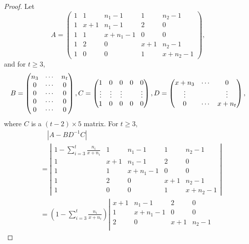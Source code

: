 \documentclass[12pt]{article}
\numberwithin{equation}{section}
\begin{document}
\begin{proof} Let \[
 A=\begin{pmatrix}
1 & 1 & n_1-1 & 1 & n_2-1 \\
1 & x+1 & n_1-1 & 2 & 0\\
1 & 1 & x+n_1-1 & 0 & 0 \\
1 & 2 & 0 & x+1 & n_2-1 \\
1 & 0 & 0 & 1 & x+n_2-1
\end{pmatrix}, 
\]
and for $t\ge 3$, 
\[
B=\begin{pmatrix}
 n_3 & \cdots & n_t\\
 0 & \cdots & 0\\
 0 & \cdots & 0\\
 0 & \cdots & 0\\
 0 & \cdots & 0\\
\end{pmatrix},\\
 C=\begin{pmatrix}
1 & 0 & 0 & 0 & 0 \\
\vdots & \vdots & \vdots & & \vdots\\
1 & 0 & 0 & 0 & 0 
\end{pmatrix}, 
D=\begin{pmatrix}
x+n_3 & \cdots & 0\\
 \vdots & & \vdots\\
0 & \cdots & x+n_t
\end{pmatrix},
\]
where $C$ is a $(t-2)\times 5$ matrix. For $t\ge 3$,
\begin{align*}
&\quad |A-BD^{-1}C|\\
&=\left| \begin{array}{ccccc}
1-\sum_{i=3}^{t}\frac{n_i}{x+n_i} & 1 & n_1-1 & 1 & n_2-1\\
1 & x+1 & n_1-1 & 2 & 0\\
1 & 1 & x+n_1-1 & 0 & 0\\
1 & 2 & 0 & x+1 & n_2-1\\
1 & 0 & 0 & 1 & x+n_2-1
\end{array} \right| \\
& =\left(1-\sum_{i=3}^{t}\frac{n_i}{x+n_i}\right) \left|\begin{array}{cccc}
x+1 & n_1-1 & 2 & 0\\
1 & x+n_1-1 & 0 & 0\\
2 & 0 & x+1 & n_2-1\\

\end{array}
\end{align*}
\end{proof}
\end{document}
